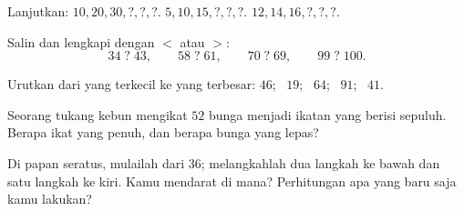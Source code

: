 \begin{exercise}[$\star$]\label{exo:g1:tens:5}
Lanjutkan: $10, 20, 30, ?, ?, ?$. \quad
$5, 10, 15, ?, ?, ?$. \quad $12, 14, 16, ?, ?, ?$.
\end{exercise}

\begin{exercise}[$\star$]\label{exo:g1:tens:6}
Salin dan lengkapi dengan $<$ atau $>$:
\[
34 \;?\; 43, \qquad
58 \;?\; 61, \qquad
70 \;?\; 69, \qquad
99 \;?\; 100 .
\]
\end{exercise}

\begin{exercise}[$\star$]\label{exo:g1:tens:7}
Urutkan dari yang terkecil ke yang terbesar: $46$; \ $19$; \ $64$; \
$91$; \ $41$.
\end{exercise}

\begin{exercise}[$\star$]\label{exo:g1:tens:8}
Seorang tukang kebun mengikat $52$ bunga menjadi ikatan yang berisi
sepuluh. Berapa ikat yang penuh, dan berapa bunga yang lepas?
\end{exercise}

\begin{exercise}[$\star\star$]\label{exo:g1:tens:9}
Di papan seratus, mulailah dari $36$; melangkahlah dua langkah ke
bawah dan satu langkah ke kiri. Kamu mendarat di mana? Perhitungan
apa yang baru saja kamu lakukan?

\end{exercise}
